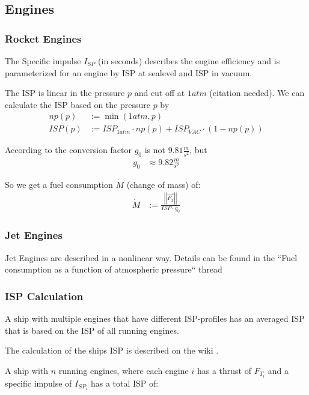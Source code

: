 \documentclass[11pt]{article}
\newcommand{\oa}[1]{\overrightarrow{#1}}
\newcommand{\absvec}[1]{\left|\left|{#1}\right|\right|}
\begin{document}
\subsection{Engines}

\subsubsection{Rocket Engines}

The Specific impulse $I_{SP}$ (in seconds) describes the engine
efficiency and is parameterized for an engine by ISP at sealevel and
ISP in vacuum.

The ISP is linear in the pressure $p$ and cut off at $1atm$
(citation needed).  We can calculate the ISP based on the pressure
$p$ by
\begin{align}
  np(p) &:= \min(1 atm, p)\\
  ISP(p) &:= ISP_{1atm} \cdot np(p) + ISP_{VAC} \cdot (1-np(p))
\end{align}

According to \cite{ECF} the conversion factor $g_0$ is not
$9.81\frac{m}{s^2}$, but
\begin{align}
  g_0 &\approx 9.82\frac{m}{s^2}
\end{align}

So we get a fuel consumption $\dot{M}$ (change of mass) \cite{SPI} of:
\begin{align}
\dot{M} & := \frac{\absvec{\oa{F_T}}}{ISP \cdot g_0}
\end{align}

\subsubsection{Jet Engines}

Jet Engines are described in a nonlinear way. Details can be found in
the ``Fuel consumption as a function of atmospheric pressure`` thread
\cite{JetEngines}

\subsubsection{ISP Calculation}

A ship with multiple engines that have different ISP-profiles has an
averaged ISP that is based on the ISP of all running engines.

The calculation of the ships ISP is described on the wiki
\cite{MulEng}.

A ship with $n$ running engines, where each engine $i$ has a thrust of
$F_{T_i}$ and a specific impulse of $I_{SP_i}$ has a total ISP of:
\end{document}
